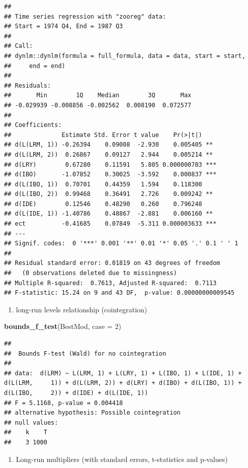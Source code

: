 \documentclass[
]{book}
\newenvironment{Shaded}{\begin{snugshade}}{\end{snugshade}}
\newcommand{\AttributeTok}[1]{\textcolor[rgb]{0.13,0.29,0.53}{#1}}
\newcommand{\DecValTok}[1]{\textcolor[rgb]{0.00,0.00,0.81}{#1}}
\newcommand{\FunctionTok}[1]{\textcolor[rgb]{0.13,0.29,0.53}{\textbf{#1}}}
\newcommand{\NormalTok}[1]{#1}
\providecommand{\tightlist}{%
  \setlength{\itemsep}{0pt}\setlength{\parskip}{0pt}}
\begin{document}
\begin{verbatim}
## 
## Time series regression with "zooreg" data:
## Start = 1974 Q4, End = 1987 Q3
## 
## Call:
## dynlm::dynlm(formula = full_formula, data = data, start = start, 
##     end = end)
## 
## Residuals:
##       Min        1Q    Median        3Q       Max 
## -0.029939 -0.008856 -0.002562  0.008190  0.072577 
## 
## Coefficients:
##              Estimate Std. Error t value    Pr(>|t|)    
## d(L(LRM, 1)) -0.26394    0.09008  -2.930    0.005405 ** 
## d(L(LRM, 2))  0.26867    0.09127   2.944    0.005214 ** 
## d(LRY)        0.67280    0.11591   5.805 0.000000703 ***
## d(IBO)       -1.07852    0.30025  -3.592    0.000837 ***
## d(L(IBO, 1))  0.70701    0.44359   1.594    0.118300    
## d(L(IBO, 2))  0.99468    0.36491   2.726    0.009242 ** 
## d(IDE)        0.12546    0.48290   0.260    0.796248    
## d(L(IDE, 1)) -1.40786    0.48867  -2.881    0.006160 ** 
## ect          -0.41685    0.07849  -5.311 0.000003633 ***
## ---
## Signif. codes:  0 '***' 0.001 '**' 0.01 '*' 0.05 '.' 0.1 ' ' 1
## 
## Residual standard error: 0.01819 on 43 degrees of freedom
##   (0 observations deleted due to missingness)
## Multiple R-squared:  0.7613, Adjusted R-squared:  0.7113 
## F-statistic: 15.24 on 9 and 43 DF,  p-value: 0.00000000009545
\end{verbatim}

\begin{enumerate}
\def\labelenumi{\arabic{enumi}.}
\setcounter{enumi}{3}
\tightlist
\item
  long-run levels relationship (cointegration)
\end{enumerate}

\begin{Shaded}
\begin{Highlighting}[]
\FunctionTok{bounds\_f\_test}\NormalTok{(BestMod, }\AttributeTok{case =} \DecValTok{2}\NormalTok{)}
\end{Highlighting}
\end{Shaded}

\begin{verbatim}
## 
##  Bounds F-test (Wald) for no cointegration
## 
## data:  d(LRM) ~ L(LRM, 1) + L(LRY, 1) + L(IBO, 1) + L(IDE, 1) + d(L(LRM,     1)) + d(L(LRM, 2)) + d(LRY) + d(IBO) + d(L(IBO, 1)) + d(L(IBO,     2)) + d(IDE) + d(L(IDE, 1))
## F = 5.1168, p-value = 0.004418
## alternative hypothesis: Possible cointegration
## null values:
##    k    T 
##    3 1000
\end{verbatim}

\begin{enumerate}
\def\labelenumi{\arabic{enumi}.}
\setcounter{enumi}{4}
\tightlist
\item
  Long-run multipliers (with standard errors, t-statistics and p-values)
\end{enumerate}
\end{document}
